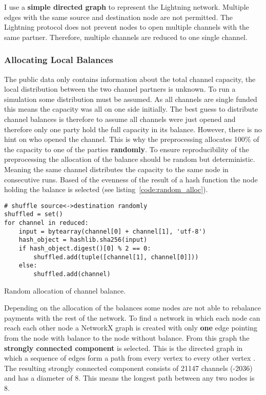 \documentclass[final]{fhnwreport}       %
\begin{document}
I use a \textbf{simple directed graph} to represent the Lightning network. Multiple edges with the same source and destination node are not permitted. The Lightning protocol does not prevent nodes to open multiple channels with the same partner. Therefore, multiple channels are reduced to one single channel.

\subsubsection{Allocating Local Balances}
The public data only contains information about the total channel capacity, the local distribution between the two channel partners is unknown. To run a simulation some distribution must be assumed. As all channels are single funded this means the capacity was all on one side initially. The best guess to distribute channel balances is therefore to assume all channels were just opened and therefore only one party hold the full capacity in its balance. However, there is no hint on who opened the channel. This is why the preprocessing allocates 100\% of the capacity to one of the parties \textbf{randomly}. To ensure reproducibility of the preprocessing the allocation of the balance should be random but deterministic. Meaning the same channel distributes the capacity to the same node in consecutive runs. Based of the evenness of the result of a hash function  the node holding the balance is selected (see listing~\ref{code:random_alloc}).

\begin{listing}[H]
  \begin{verbatim}
# shuffle source<->destination randomly
shuffled = set()
for channel in reduced:
    input = bytearray(channel[0] + channel[1], 'utf-8')
    hash_object = hashlib.sha256(input)
    if hash_object.digest()[0] % 2 == 0:
        shuffled.add(tuple([channel[1], channel[0]]))
    else:
        shuffled.add(channel) 
  \end{verbatim}
  \caption{Random allocation of channel balance.}
  \label{code:random_alloc}
\end{listing}

Depending on the allocation of the balances some nodes are not able to rebalance payments with the rest of the network. To find a network in which each node can reach each other node a NetworkX graph is created with only \textbf{one} edge pointing from the node with balance to the node without balance. From this graph the \textbf{strongly connected component} is selected. This is the directed graph in which a sequence of edges form a path from every vertex to every other vertex \citep{even_network_1975}. The resulting strongly connected component consists of 21147 channels (-2036) and has a diameter of 8. This means the longest path between any two nodes is 8.
\end{document}
